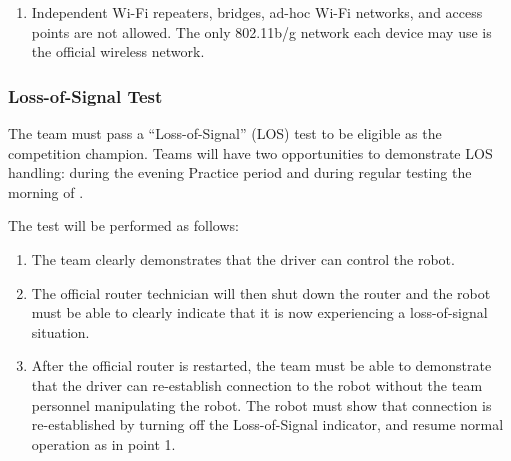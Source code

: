 \begin{enumerate}
\item Independent Wi-Fi repeaters, bridges, ad-hoc Wi-Fi networks, and access points are not allowed. The only 802.11b/g network each device may use is the official wireless network.
\end{enumerate}

\subsubsection{Loss-of-Signal Test}
\label{los}
The team must pass a “Loss-of-Signal” (LOS) test to be eligible as the competition champion. Teams will have two opportunities to demonstrate LOS handling: \textbf{\los} during the evening Practice period and during regular testing the morning of \textbf{\competition}.

The test will be performed as follows:

\begin{enumerate}
\item The team clearly demonstrates that the driver can control the robot.
\item The official router technician will then shut down the router and the robot must be able to clearly indicate that it is now experiencing a loss-of-signal situation.
\item After the official router is restarted, the team must be able to demonstrate that the driver can re-establish connection to the robot without the team personnel manipulating the robot. The robot must show that connection is re-established by turning off the Loss-of-Signal indicator, and resume normal operation as in point 1.
\end{enumerate}